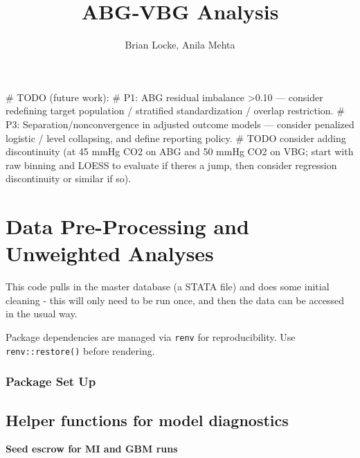 \documentclass[
  11pt,
  letterpaper,
  DIV=11,
  numbers=noendperiod]{scrartcl}
\title{ABG‑VBG Analysis}
\author{Brian Locke, Anila Mehta}
\date{}
\newenvironment{Shaded}{\begin{snugshade}}{\end{snugshade}}
\newcommand{\AlertTok}[1]{\textcolor[rgb]{0.68,0.00,0.00}{#1}}
\newcommand{\CommentTok}[1]{\textcolor[rgb]{0.37,0.37,0.37}{#1}}
\newenvironment{Shaded}{}{}%
\renewenvironment{Shaded}{}{}%
\renewcommand*\contentsname{Table of contents}
\newcommand\contentsname{Table of contents}
\begin{document}
\maketitle

\renewcommand*\contentsname{Table of contents}
{
\hypersetup{linkcolor=}
\setcounter{tocdepth}{3}
\tableofcontents
}

\begin{Shaded}
\begin{Highlighting}[]
\CommentTok{\# }\AlertTok{TODO}\CommentTok{ (future work):}
\CommentTok{\# P1: ABG residual imbalance \textgreater{}0.10 — consider redefining target population / stratified standardization / overlap restriction.}
\CommentTok{\# P3: Separation/nonconvergence in adjusted outcome models — consider penalized logistic / level collapsing, and define reporting policy.}
\CommentTok{\# }\AlertTok{TODO}\CommentTok{ consider adding discontinuity (at 45 mmHg CO2 on ABG and 50 mmHg CO2 on VBG; start with raw binning and LOESS to evaluate if there\textquotesingle{}s a jump, then consider regression discontinuity or similar if so).}
\end{Highlighting}
\end{Shaded}

\section{Data Pre-Processing and Unweighted
Analyses}\label{data-pre-processing-and-unweighted-analyses}

This code pulls in the master database (a STATA file) and does some
initial cleaning - this will only need to be run once, and then the data
can be accessed in the usual way.

Package dependencies are managed via \texttt{renv} for reproducibility.
Use \texttt{renv::restore()} before rendering.

\subsubsection{Package Set Up}\label{package-set-up}

\subsection{Helper functions for model
diagnostics}\label{helper-functions-for-model-diagnostics}

\begin{center}\textbf{Seed escrow for MI and GBM runs}\end{center}
\end{document}
